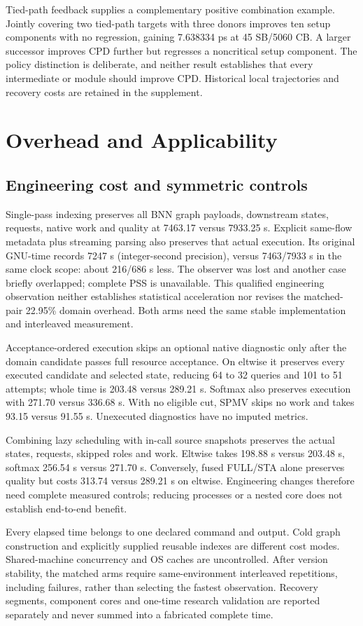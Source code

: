 \documentclass[conference,10pt]{IEEEtran}
\begin{document}
Tied-path feedback supplies a complementary positive combination example. Jointly covering two tied-path targets with three donors improves ten setup components with no regression, gaining 7.638334 ps at 45 SB/5060 CB. A larger successor improves CPD further but regresses a noncritical setup component. The policy distinction is deliberate, and neither result establishes that every intermediate or module should improve CPD. Historical local trajectories and recovery costs are retained in the supplement.
\section{Overhead and Applicability}
\subsection{Engineering cost and symmetric controls}
Single-pass indexing preserves all BNN graph payloads, downstream states, requests, native work and quality at 7463.17 versus 7933.25 s. Explicit same-flow metadata plus streaming parsing also preserves that actual execution. Its original GNU-time records 7247 s (integer-second precision), versus 7463/7933 s in the same clock scope: about 216/686 s less. The observer was lost and another case briefly overlapped; complete PSS is unavailable. This qualified engineering observation neither establishes statistical acceleration nor revises the matched-pair 22.95\% domain overhead. Both arms need the same stable implementation and interleaved measurement.

Acceptance-ordered execution skips an optional native diagnostic only after the domain candidate passes full resource acceptance. On eltwise it preserves every executed candidate and selected state, reducing 64 to 32 queries and 101 to 51 attempts; whole time is 203.48 versus 289.21 s. Softmax also preserves execution with 271.70 versus 336.68 s. With no eligible cut, SPMV skips no work and takes 93.15 versus 91.55 s. Unexecuted diagnostics have no imputed metrics.

Combining lazy scheduling with in-call source snapshots preserves the actual states, requests, skipped roles and work. Eltwise takes 198.88 s versus 203.48 s, softmax 256.54 s versus 271.70 s. Conversely, fused FULL/STA alone preserves quality but costs 313.74 versus 289.21 s on eltwise. Engineering changes therefore need complete measured controls; reducing processes or a nested core does not establish end-to-end benefit.

Every elapsed time belongs to one declared command and output. Cold graph construction and explicitly supplied reusable indexes are different cost modes. Shared-machine concurrency and OS caches are uncontrolled. After version stability, the matched arms require same-environment interleaved repetitions, including failures, rather than selecting the fastest observation. Recovery segments, component cores and one-time research validation are reported separately and never summed into a fabricated complete time.
\end{document}
